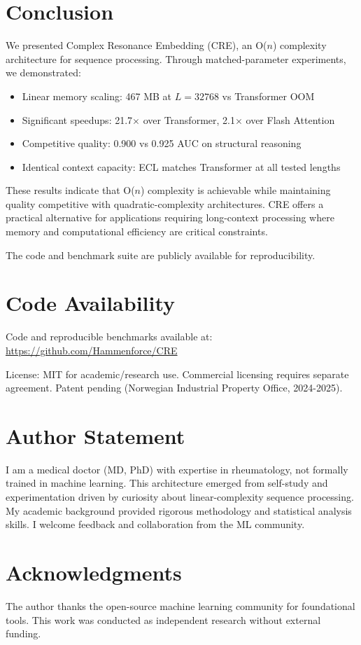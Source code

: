\documentclass{article}
\begin{document}
\section{Conclusion}

We presented Complex Resonance Embedding (CRE), an O($n$) complexity architecture for sequence processing. Through matched-parameter experiments, we demonstrated:

\begin{itemize}
\item Linear memory scaling: 467 MB at $L=32768$ vs Transformer OOM
\item Significant speedups: 21.7$\times$ over Transformer, 2.1$\times$ over Flash Attention
\item Competitive quality: 0.900 vs 0.925 AUC on structural reasoning
\item Identical context capacity: ECL matches Transformer at all tested lengths
\end{itemize}

These results indicate that O($n$) complexity is achievable while maintaining quality competitive with quadratic-complexity architectures. CRE offers a practical alternative for applications requiring long-context processing where memory and computational efficiency are critical constraints.

The code and benchmark suite are publicly available for reproducibility.

\section*{Code Availability}

Code and reproducible benchmarks available at: \url{https://github.com/Hammenforce/CRE}

License: MIT for academic/research use. Commercial licensing requires separate agreement. Patent pending (Norwegian Industrial Property Office, 2024-2025).

\section*{Author Statement}

I am a medical doctor (MD, PhD) with expertise in rheumatology, not formally trained in machine learning. This architecture emerged from self-study and experimentation driven by curiosity about linear-complexity sequence processing. My academic background provided rigorous methodology and statistical analysis skills. I welcome feedback and collaboration from the ML community.

\section*{Acknowledgments}

The author thanks the open-source machine learning community for foundational tools. This work was conducted as independent research without external funding.


\end{document}
